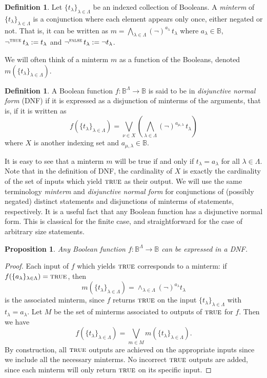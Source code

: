 \documentclass[psamsfonts]{amsart}
\newtheorem{prop}[thm]{Proposition}
\theoremstyle{definition}
\newtheorem{defn}[thm]{Definition}
\theoremstyle{remark}
\numberwithin{equation}{section}
\def\TRUE{\textsc{true}}
\def\FALSE{\textsc{false}}
\def\AND{\wedge}
\def\bigAND{\bigwedge}
\def\bigOR{\bigvee}
\def\NOT{\neg}
\begin{document}
\begin{defn}
\label{def_minterm}
Let $\{t_{\lambda}\}_{\lambda\in\Lambda}$ be an indexed collection of Booleans. A \emph{minterm} of $\{t_{\lambda}\}_{\lambda\in\Lambda}$ is a conjunction where each element appears only once, either negated or not. That is, it can be written as $m = \bigAND \limits_{\lambda\in\Lambda} (\NOT)^{a_{\lambda}} \, t_{\lambda}$ where $a_{\lambda} \in \mathbb{B}$, $\NOT ^ \TRUE \, t_{\lambda} := t_{\lambda}$ and $\NOT ^ \FALSE \, t_{\lambda} := \NOT t_{\lambda}$.
\end{defn}
We will often think of a minterm $m$ as a function of the Booleans, denoted $m(\{t_{\lambda}\}_{\lambda\in\Lambda})$. 
\begin{defn}
\label{def_dnf}
A Boolean function $f:\mathbb{B}^{\Lambda}\to\mathbb{B}$ is said to be in \emph{disjunctive normal form} (DNF) if it is expressed as a disjunction of minterms of the arguments, that is, if it is written as
 $$f(\{t_{\lambda}\}_{\lambda\in\Lambda}) =\bigOR \limits_{\nu\in X} \left( \bigAND \limits_{\lambda\in\Lambda} (\NOT)^{a_{\mu,\lambda}} \, t_{\lambda} \right)$$ where $X$ is another indexing set and  $a_{\mu,\lambda} \in \mathbb{B}$. 
\end{defn}

It is easy to see that a minterm $m$ will be true if and only if $t_{\lambda}=a_{\lambda}$ for all $\lambda\in\Lambda$. Note that in the definition of DNF, the cardinality of $X$ is exactly the cardinality of the set of inputs which yield $\TRUE$ as their output. We will use the same terminology \emph{minterm} and \emph{disjunctive normal form} for conjunctions of (possibly negated) distinct statements and disjunctions of minterms of statements, respectively. It is a useful fact that any Boolean function has a disjunctive normal form. This is classical for the finite case, and straightforward for the case of arbitrary size statements.

\begin{prop}\label{prop_dnf}
Any Boolean function $f:\mathbb{B}^{\Lambda}\to\mathbb{B}$ can be expressed in a DNF. 
\end{prop}
\begin{proof}
Each input of $f$ which yields $\TRUE$ corresponds to a minterm: if $f(\{a_{\lambda}\}_{\lambda\in\Lambda})=\TRUE$, then $$m(\{t_{\lambda}\}_{\lambda\in\Lambda}) = \AND_{\lambda\in\Lambda}(\NOT)^{a_{\lambda}}t_{\lambda}$$ is the associated minterm, since $f$ returns $\TRUE$ on the input $\{t_{\lambda}\}_{\lambda\in\Lambda}$ with $t_{\lambda}=a_{\lambda}$. Let $M$ be the set of minterms associated to outputs of $\TRUE$ for $f$. Then we have
$$
f(\{t_{\lambda}\}_{\lambda\in\Lambda}) = \bigOR\limits_{m\in M}m(\{t_{\lambda}\}_{\lambda\in\Lambda}).
$$
By construction, all $\TRUE$ outputs are achieved on the appropriate inputs since we include all the necessary minterms. No incorrect $\TRUE$ outputs are added, since each minterm will only return $\TRUE$ on its specific input. 
\end{proof}
\end{document}
